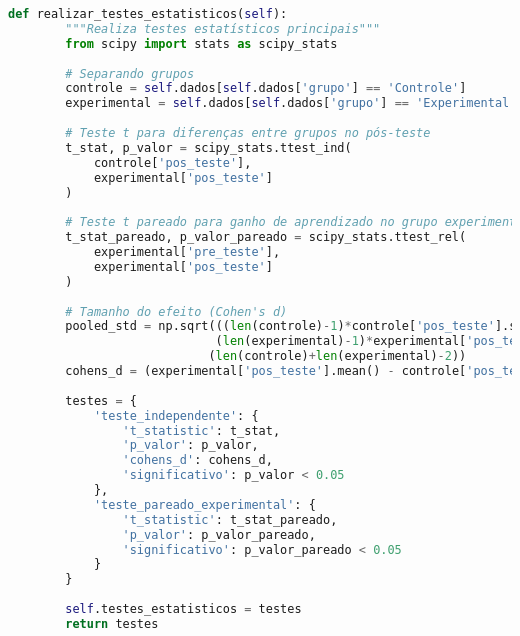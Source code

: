 \begin{pythonbox}
\begin{lstlisting}[language=Python]
    def realizar_testes_estatisticos(self):
        """Realiza testes estatísticos principais"""
        from scipy import stats as scipy_stats
        
        # Separando grupos
        controle = self.dados[self.dados['grupo'] == 'Controle']
        experimental = self.dados[self.dados['grupo'] == 'Experimental']
        
        # Teste t para diferenças entre grupos no pós-teste
        t_stat, p_valor = scipy_stats.ttest_ind(
            controle['pos_teste'], 
            experimental['pos_teste']
        )
        
        # Teste t pareado para ganho de aprendizado no grupo experimental
        t_stat_pareado, p_valor_pareado = scipy_stats.ttest_rel(
            experimental['pre_teste'], 
            experimental['pos_teste']
        )
        
        # Tamanho do efeito (Cohen's d)
        pooled_std = np.sqrt(((len(controle)-1)*controle['pos_teste'].std()**2 + 
                             (len(experimental)-1)*experimental['pos_teste'].std()**2) / 
                            (len(controle)+len(experimental)-2))
        cohens_d = (experimental['pos_teste'].mean() - controle['pos_teste'].mean()) / pooled_std
        
        testes = {
            'teste_independente': {
                't_statistic': t_stat,
                'p_valor': p_valor,
                'cohens_d': cohens_d,
                'significativo': p_valor < 0.05
            },
            'teste_pareado_experimental': {
                't_statistic': t_stat_pareado,
                'p_valor': p_valor_pareado,
                'significativo': p_valor_pareado < 0.05
            }
        }
        
        self.testes_estatisticos = testes
        return testes
\end{lstlisting}
\end{pythonbox}

